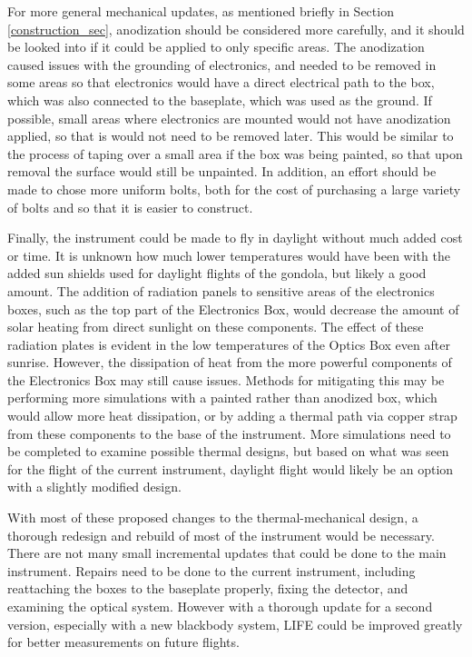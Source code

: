 For more general mechanical updates, as mentioned briefly in Section \ref{construction_sec}, anodization should be considered more carefully, and it should be looked into if it could be applied to only specific areas. The anodization caused issues with the grounding of electronics, and needed to be removed in some areas so that electronics would have a direct electrical path to the box, which was also connected to the baseplate, which was used as the ground. If possible, small areas where electronics are mounted would not have anodization applied, so that is would not need to be removed later. This would be similar to the process of taping over a small area if the box was being painted, so that upon removal the surface would still be unpainted. In addition, an effort should be made to chose more uniform bolts, both for the cost of purchasing a large variety of bolts and so that it is easier to construct.

Finally, the instrument could be made to fly in daylight without much added cost or time. It is unknown how much lower temperatures would have been with the added sun shields used for daylight flights of the gondola, but likely a good amount. The addition of radiation panels to sensitive areas of the electronics boxes, such as the top part of the Electronics Box, would decrease the amount of solar heating from direct sunlight on these components. The effect of these radiation plates is evident in the low temperatures of the Optics Box even after sunrise. However, the dissipation of heat from the more powerful components of the Electronics Box may still cause issues. Methods for mitigating this may be performing more simulations with a painted rather than anodized box, which would allow more heat dissipation, or by adding a thermal path via copper strap from these components to the base of the instrument. More simulations need to be completed to examine possible thermal designs, but based on what was seen for the flight of the current instrument, daylight flight would likely be an option with a slightly modified design.

With most of these proposed changes to the thermal-mechanical design, a thorough redesign and rebuild of most of the instrument would be necessary. There are not many small incremental updates that could be done to the main instrument. Repairs need to be done to the current instrument, including reattaching the boxes to the baseplate properly, fixing the detector, and examining the optical system. However with a thorough update for a second version, especially with a new blackbody system, LIFE could be improved greatly for better measurements on future flights.

